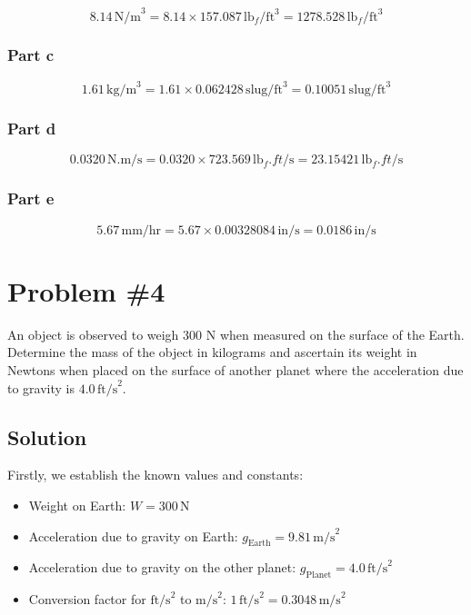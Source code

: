 \documentclass{article}
\begin{document}
\[
8.14 \, \text{N/m}^3 = 8.14 \times 157.087 \, \text{lb}_f/\text{ft}^3 = 1278.528 \, \text{lb}_f/\text{ft}^3
\]

\subsubsection*{Part c}

\[
1.61 \, \text{kg/m}^3 = 1.61 \times 0.062428 \, \text{slug/ft}^3 = 0.10051 \, \text{slug/ft}^3
\]

\subsubsection*{Part d}

\[
0.0320 \, \text{N.m/s} = 0.0320 \times 723.569 \, \text{lb}_f.ft/\text{s} = 23.15421 \, \text{lb}_f.ft/\text{s}
\]

\subsubsection*{Part e}

\[
5.67 \, \text{mm/hr} = 5.67 \times 0.00328084 \, \text{in/s} = 0.0186 \, \text{in/s}
\]

\newpage %

\section*{Problem \#4}
An object is observed to weigh 300 N when measured on the surface of the Earth. Determine the mass of the object in kilograms and ascertain its weight in Newtons when placed on the surface of another planet where the acceleration due to gravity is \(4.0 \, \text{ft/s}^2\).

\subsection*{Solution}

Firstly, we establish the known values and constants:
\begin{itemize}
    \item Weight on Earth: \( W = 300 \, \text{N} \)
    \item Acceleration due to gravity on Earth: \( g_{\text{Earth}} = 9.81 \, \text{m/s}^2 \)
    \item Acceleration due to gravity on the other planet: \( g_{\text{Planet}} = 4.0 \, \text{ft/s}^2 \)
    \item Conversion factor for \( \text{ft/s}^2 \) to \( \text{m/s}^2 \): \( 1 \, \text{ft/s}^2 = 0.3048 \, \text{m/s}^2 \)
\end{itemize}
\end{document}
